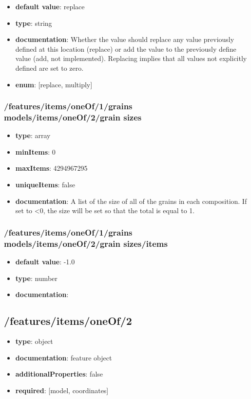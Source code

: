 \begin{itemize}\item {\bf default value}: replace
\item {\bf type}: string
\item {\bf documentation}: Whether the value should replace any value previously defined at this location (replace) or add the value to the previously define value (add, not implemented). Replacing implies that all values not explicitly defined are set to zero.
\item {\bf enum}: [replace, multiply]\end{itemize}\subsubsection{/features/items/oneOf/1/grains models/items/oneOf/2/grain sizes}
\begin{itemize}\item {\bf type}: array
\item {\bf minItems}: 0
\item {\bf maxItems}: 4294967295
\item {\bf uniqueItems}: false
\item {\bf documentation}: A list of the size of all of the grains in each composition. If set to <0, the size will be set so that the total is equal to 1.
\end{itemize}\subsubsection{/features/items/oneOf/1/grains models/items/oneOf/2/grain sizes/items}
\begin{itemize}\item {\bf default value}: -1.0
\item {\bf type}: number
\item {\bf documentation}: 
\end{itemize}\subsection{/features/items/oneOf/2}
\begin{itemize}\item {\bf type}: object
\item {\bf documentation}: feature object
\item {\bf additionalProperties}: false
\item {\bf required}: [model, coordinates]\end{itemize}
